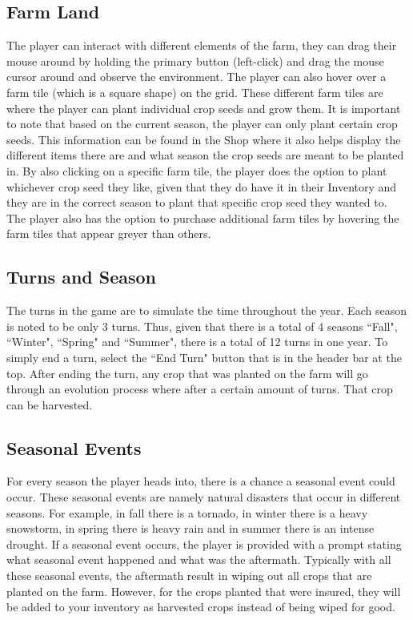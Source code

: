 \documentclass{article}
\begin{document}
\subsection{Farm Land}
The player can interact with different elements of the farm, they can drag their mouse around by holding the primary button (left-click) and drag the mouse cursor around and observe the environment. The player can also hover over a farm tile (which is a square shape) on the grid. These different farm tiles are where the player can plant individual crop seeds and grow them. It is important to note that based on the current season, the player can only plant certain crop seeds. This information can be found in the Shop where it also helps display the different items there are and what season the crop seeds are meant to be planted in. By also clicking on a specific farm tile, the player does the option to plant whichever crop seed they like, given that they do have it in their Inventory and they are in the correct season to plant that specific crop seed they wanted to. The player also has the option to purchase additional farm tiles by hovering the farm tiles that appear greyer than others. 

\subsection{Turns and Season}
The turns in the game are to simulate the time throughout the year. Each season is noted to be only 3 turns. Thus, given that there is a total of 4 seasons ``Fall", ``Winter", ``Spring" and ``Summer", there is a total of 12 turns in one year. To simply end a turn, select the ``End Turn" button that is in the header bar at the top. After ending the turn, any crop that was planted on the farm will go through an evolution process where after a certain amount of turns. That crop can be harvested. 

\subsection{Seasonal Events}
For every season the player heads into, there is a chance a seasonal event could occur. These seasonal events are namely natural disasters that occur in different seasons. For example, in fall there is a tornado, in winter there is a  heavy snowstorm, in spring there is heavy rain and in summer there is an intense drought. If a seasonal event occurs, the player is provided with a prompt stating what seasonal event happened and what was the aftermath. Typically with all these seasonal events, the aftermath result in wiping out all crops that are planted on the farm. However, for the crops planted that were insured, they will be added to your inventory as harvested crops instead of being wiped for good. 
\end{document}

